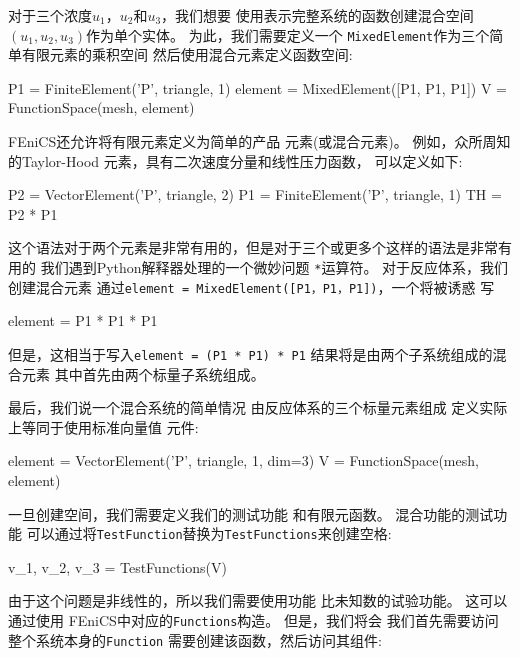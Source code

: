 
对于三个浓度$u_1$，$u_2$和$u_3$，我们想要
使用表示完整系统的函数创建混合空间
$(u_1, u_2, u_3)$作为单个实体。 为此，我们需要定义一个
\texttt{MixedElement}作为三个简单有限元素的乘积空间
然后使用混合元素定义函数空间:

\begin{python}
P1 = FiniteElement('P', triangle, 1)
element = MixedElement([P1, P1, P1])
V = FunctionSpace(mesh, element)
\end{python}

\begin{notice}[混合元素作为元素的产物]
FEniCS还允许将有限元素定义为简单的产品
元素(或混合元素)。 例如，众所周知的Taylor-Hood
元素，具有二次速度分量和线性压力函数，
可以定义如下:

\begin{python}
P2 = VectorElement('P', triangle, 2)
P1 = FiniteElement('P', triangle, 1)
TH = P2 * P1
\end{python}
这个语法对于两个元素是非常有用的，但是对于三个或更多个这样的语法是非常有用的
我们遇到Python解释器处理的一个微妙问题
\texttt{*}运算符。 对于反应体系，我们创建混合元素
通过\texttt{element = MixedElement([P1，P1，P1])}，一个将被诱惑
写

\begin{python}
element = P1 * P1 * P1
\end{python}
但是，这相当于写入\texttt{element = (P1 * P1) * P1}
结果将是由两个子系统组成的混合元素
其中首先由两个标量子系统组成。

最后，我们说一个混合系统的简单情况
由反应体系的三个标量元素组成
定义实际上等同于使用标准向量值
元件:


\begin{python}
element = VectorElement('P', triangle, 1, dim=3)
V = FunctionSpace(mesh, element)
\end{python}
\end{notice}

一旦创建空间，我们需要定义我们的测试功能
和有限元函数。 混合功能的测试功能
可以通过将\texttt{TestFunction}替换为\texttt{TestFunctions}来创建空格:

\begin{python}
v_1, v_2, v_3 = TestFunctions(V)
\end{python}

由于这个问题是非线性的，所以我们需要使用功能
比未知数的试验功能。 这可以通过使用
FEniCS中对应的\texttt{Functions}构造。 但是，我们将会
我们首先需要访问整个系统本身的\texttt{Function}
需要创建该函数，然后访问其组件:

